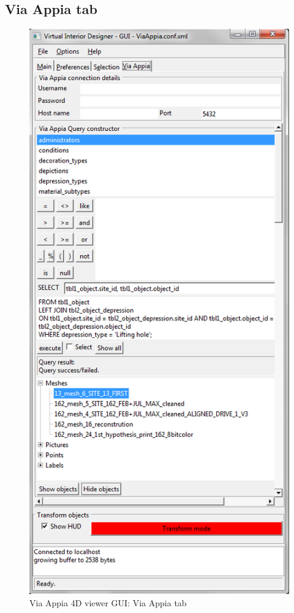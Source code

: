 \documentclass[a4paper,11pt]{article}
\begin{document}
\subsection{Via Appia tab}

\begin{figure}[!ht]
\centering
\includegraphics[scale=0.5]{fig/viaappia}
\caption{Via Appia 4D viewer GUI: Via Appia tab}
\label{fig-guiva}
\end{figure}
\end{document}
